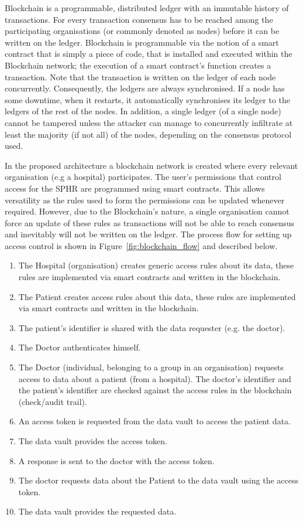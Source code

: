 Blockchain is a programmable, distributed ledger with an immutable history of transactions. 
For every transaction consensus has to be reached among the participating organisations (or commonly denoted as nodes) before it can be written on the ledger. %
Blockchain is programmable via the notion of a smart contract that is simply a piece of code, that is installed and executed within the Blockchain network; the execution of a smart contract's function creates a transaction. Note that the transaction is written on the ledger of each node concurrently. Consequently, the ledgers are always synchronised. If a node has some downtime, when it restarts, it automatically synchronises its ledger to the ledgers of the rest of the nodes. In addition, a single ledger (of a single node) cannot be tampered unless the attacker can manage to concurrently infiltrate at least the majority (if not all) of the nodes, depending on the consensus protocol used.

In the proposed architecture a blockchain network is created where every relevant organisation (e.g a hospital) participates. The user's permissions that control access for the SPHR are programmed using smart contracts. This allows versatility as the rules used to form the permissions can be updated whenever required. However, due to the Blockchain's nature, a single organisation cannot force an update of these rules as transactions will not be able to reach consensus and inevitably will not be written on the ledger.
The process flow for setting up access control is shown in Figure~\ref{fig:blockchain_flow} and described below.
\begin{enumerate}
    \item The Hospital (organisation) creates generic access rules about its data, these rules are implemented via smart contracts and written in the blockchain.
    \item The Patient creates access rules about this data, these rules are implemented via smart contracts and written in the blockchain.
    \item The patient's identifier is shared with the data requester (e.g. the doctor).
    \item The Doctor authenticates himself.
    \item The Doctor (individual, belonging to a group in an organisation) requests access to data about a patient (from a hospital). The doctor's identifier and the patient's identifier are checked against the access rules in the blockchain (check/audit trail).
    \item An access token is requested from the data vault to access the patient data.
    \item The data vault provides the access token.
    \item A response is sent to the doctor with the access token.
    \item The doctor requests data about the Patient to the data vault using the access token.
    \item The data vault provides the requested data.
\end{enumerate}

